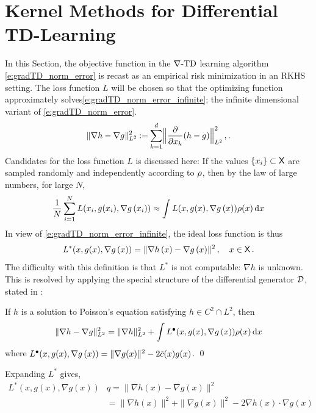 \section{Kernel Methods for Differential TD-Learning}
\label{s:kernel_choices}
In this Section, the objective function in the $\nabla\text{-TD}$ learning algorithm \eqref{e:gradTD_norm_error} is recast as an empirical risk minimization in an RKHS setting. The   loss function $L$ will be chosen so that the optimizing function approximately solves\eqref{e:gradTD_norm_error_infinite}; the infinite dimensional variant of \eqref{e:gradTD_norm_error}. 
\begin{equation}
\| \nabla h -  \nabla g \|^2_{L^2}   \eqdef \sum_{k=1}^d    \Bigl\|  \frac{\partial}{\partial x_k} (h-g)  \Bigr\|^2_{L^2}
\, , .
\label{e:gradTD_norm_error_infinite}
\end{equation}
Candidates for the loss function $L$ is discussed here:
If the values $\{x_i\} \subset {\sf X} $  are sampled randomly and independently according to $\rho$,  then by the law of large numbers, for large $N$,
\[
\frac{1}{N} \sum_{i=1}^N L(x_i, g(x_i), \nabla g\, (x_i))  \approx
\int  L(x, g(x), \nabla g\, (x))  \rho(x)\, \text{d} x
\]
In view of \eqref{e:gradTD_norm_error_infinite}, the ideal loss function is thus
\begin{equation}
L^*(x,g(x) ,\nabla g \,(x))  =         \| \nabla h\,(x)  -\nabla g\, (x) \|^2\,, \quad x\in\state\,.
\label{e:IdealLoss}
\end{equation}
The difficulty with this definition is that $L^*$ is not computable:  $\nabla h$ is unknown. This is resolved by applying the special structure of the differential generator ${\cal D}$,  stated in :
\begin{proposition}
	\label{prop:gradTD_erm_loss}
	If $h$ is a solution to Poisson's equation satisfying $h\in C^2\cap L^2$, then
	\[
	\| \nabla h -  \nabla g\|^2_{L^2} =\| \nabla h  \|^2_{L^2} + \int   L^\bullet(x, g(x), \nabla g\, (x)) \rho(x)\, \text{d} x
	\]
	where
	$ L^\bullet(x, g(x), \nabla g\, (x)) =   \| \nabla g(x)\|^2   - 2 \tilde c(x) g(x)$.
	\qed
\end{proposition}
Expanding $L^*$ gives,	
\[
\begin{aligned}
L^*(x,g(x),\nabla g(x)) & q = \| \nabla h(x) - \nabla g(x) \|^2 \\
& = \| \nabla h(x) \|^2 + \| \nabla g(x) \|^2- 2 \nabla h(x) \cdot \nabla g(x) \\
\end{aligned}
\]
